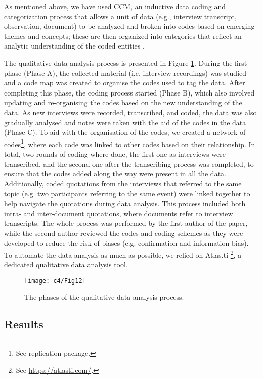 As mentioned above, we have used CCM, an inductive data coding and categorization process that allows a unit of data (e.g., interview transcript, observation, document) to be analyzed and broken into codes based on emerging themes and concepts; these are then organized into categories that reflect an analytic understanding of the coded entities \cite{Mathison2005}.

The qualitative data analysis process is presented in Figure \ref{c4:fig:qualitative-analysis}. During the first phase (Phase A), the collected material (i.e. interview recordings) was studied and a code map was created to organise the codes used to tag the data.
After completing this phase, the coding process started (Phase B), which also involved updating and re-organising the codes based on the new understanding of the data.
As new interviews were recorded, transcribed, and coded, the data was also gradually analysed and notes were taken with the aid of the codes in the data (Phase C).
To aid with the organisation of the codes, we created a network of codes\footnote{See replication package.}, where each code was linked to other codes based on their relationship.
In total, two rounds of coding where done, the first one as interviews were transcribed, and the second one after the transcribing process was completed, to ensure that the codes added along the way were present in all the data.
Additionally, coded quotations from the interviews that referred to the same topic (e.g. two participants referring to the same event) were linked together to help navigate the quotations during data analysis. This process included both intra- and inter-document quotations, where documents refer to interview transcripts.
The whole process was performed by the first author of the paper, while the second author reviewed the codes and coding schemes as they were developed to reduce the risk of biases (e.g. confirmation and information bias).
To automate the data analysis as much as possible, we relied on Atlas.ti \footnote{See \url{https://atlasti.com/}.}, a dedicated qualitative data analysis tool.

\begin{figure}
    \centering
    \texttt{[image: c4/Fig12]}
    \caption{The phases of the qualitative data analysis process.}\label{c4:fig:qualitative-analysis}
\end{figure}

\subsection{Results}\label{c4:sec:results-rq-4-and-5}

